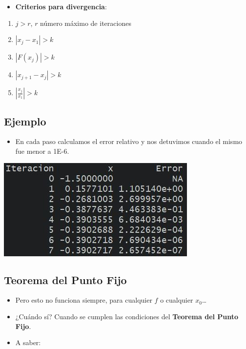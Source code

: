 \documentclass[openany]{book}
\providecommand{\tightlist}{%
  \setlength{\itemsep}{0pt}\setlength{\parskip}{0pt}}
\begin{document}
\begin{itemize}
\tightlist
\item
  \textbf{Criterios para divergencia}:
\end{itemize}

\begin{enumerate}
\def\labelenumi{\arabic{enumi}.}
\item
  \(j > r\), \(r\) número máximo de iteraciones
\item
  \(|x_j - x_1| > k\)
\item
  \(|F(x_j)| > k\)
\item
  \(|x_{j+1}-x_j| > k\)
\item
  \(\left|\frac{x_{j}}{x_1}\right| > k\)
\end{enumerate}

\hypertarget{ejemplo-1}{%
\subsection{Ejemplo}\label{ejemplo-1}}

\begin{itemize}
\tightlist
\item
  En cada paso calculamos el error relativo y nos detuvimos cuando el mismo fue menor a 1E-6.
\end{itemize}

\begin{center}\includegraphics[width=0.5\linewidth]{Plots/U2/rtdo} \end{center}

\hypertarget{teorema-del-punto-fijo}{%
\subsection{Teorema del Punto Fijo}\label{teorema-del-punto-fijo}}

\begin{itemize}
\tightlist
\item
  Pero esto no funciona siempre, para cualquier \(f\) o cualquier \(x_0\)\ldots{}
\item
  ¿Cuándo sí? Cuando se cumplen las condiciones del \textbf{Teorema del Punto Fijo}.
\item
  A saber:
\end{itemize}
\end{document}
